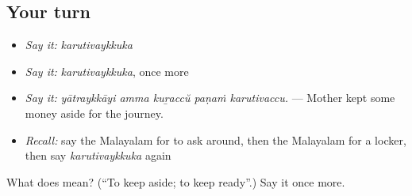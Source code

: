 \subsection*{Your turn}
\begin{itemize}
\raggedright
  \item \emph{Say it:} \emph{karutivaykkuka}
  \item \emph{Say it:} \emph{karutivaykkuka}, once more
  \item \emph{Say it:} \emph{yātraykkāyi amma kuṟaccŭ paṇaṁ karutivaccu.} — Mother kept some money aside for the journey.
  \item \emph{Recall:} say the Malayalam for to ask around, then the Malayalam for a locker, then say \emph{karutivaykkuka} again
\end{itemize}

\begin{tcolorbox}[breakable,colback=teal!4,colframe=teal!35!black,title={Before you move on}]
What does  mean? (\textquotedblleft{}To keep aside; to keep ready\textquotedblright{}.) Say it once more.
\end{tcolorbox}
